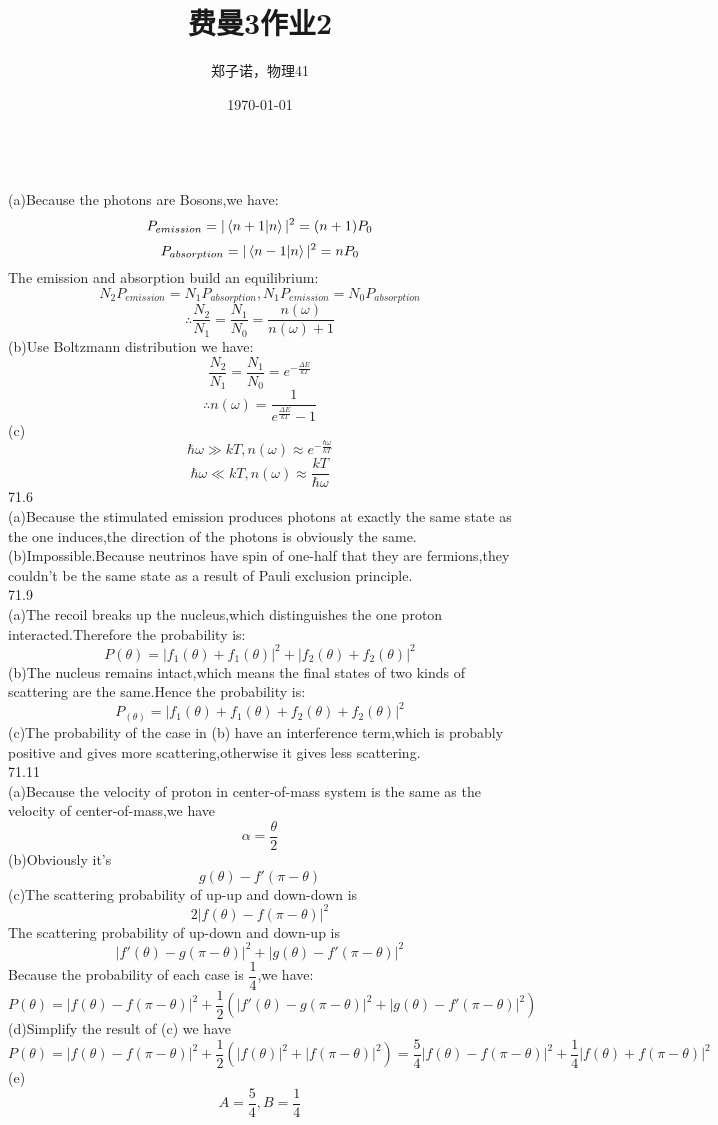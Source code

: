 \documentclass[utf8]{ctexart}
\title{费曼3作业2}
\author{郑子诺，物理41}
\date{\today}
\begin{document}
\\
(a)Because the photons are Bosons,we have:
\[P_{emission}=|\braket{n+1|n}|^2=(n+1)P_0\]
\[P_{absorption}=|\braket{n-1|n}|^2=nP_0\]
The emission and absorption build an equilibrium:
\[N_2P_{emission}=N_1P_{absorption},N_1P_{emission}=N_0P_{absorption}\]
\[\therefore\frac{N_2}{N_1}=\frac{N_1}{N_0}=\frac{n(\omega)}{n(\omega)+1}\] 
(b)Use Boltzmann distribution we have:
\[\frac{N_2}{N_1}=\frac{N_1}{N_0}=e^{-\frac{\Delta E}{kT}}\]
\[\therefore n(\omega)=\frac{1}{e^{\frac{\Delta E}{kT}}-1}\]
(c)\\
\[\hbar\omega\gg kT,n(\omega)\approx e^{-\frac{\hbar\omega}{kT}}\]
\[\hbar\omega\ll kT,n(\omega)\approx \frac{kT}{\hbar\omega}\]
71.6\\
(a)Because the stimulated emission produces photons at exactly the same state as the one induces,the direction of the photons is obviously the same.\\
(b)Impossible.Because neutrinos have spin of one-half that they are fermions,they couldn't be the same state as a result of Pauli exclusion principle.\\
71.9\\
(a)The recoil breaks up the nucleus,which distinguishes the one proton interacted.Therefore the probability is:
\[P(\theta)=|f_1(\theta)+f_1(\theta)|^2+|f_2(\theta)+f_2(\theta)|^2\]
(b)The nucleus remains intact,which means the final states of two kinds of scattering are the same.Hence the probability is:
\[P_(\theta)=|f_1(\theta)+f_1(\theta)+f_2(\theta)+f_2(\theta)|^2\]
(c)The probability of the case in (b) have an interference term,which is probably positive and gives more scattering,otherwise it gives less scattering.\\
71.11\\
(a)Because the velocity of proton in center-of-mass system is the same as the velocity of center-of-mass,we have
\[\alpha=\frac{\theta}{2}\]
(b)Obviously it's
\[g(\theta)-f'(\pi-\theta)\]
(c)The scattering probability of up-up and down-down is
\[2|f(\theta)-f(\pi-\theta)|^2\]
The scattering probability of up-down and down-up is
\[|f'(\theta)-g(\pi-\theta)|^2+|g(\theta)-f'(\pi-\theta)|^2\]
Because the probability of each case is $\dfrac{1}{4}$,we have:
\[P(\theta)=|f(\theta)-f(\pi-\theta)|^2+\frac{1}{2}(|f'(\theta)-g(\pi-\theta)|^2+|g(\theta)-f'(\pi-\theta)|^2)\]
(d)Simplify the result of (c) we have
\[P(\theta)=|f(\theta)-f(\pi-\theta)|^2+\frac{1}{2}(|f(\theta)|^2+|f(\pi-\theta)|^2)=\frac{5}{4}|f(\theta)-f(\pi-\theta)|^2+\frac{1}{4}|f(\theta)+f(\pi-\theta)|^2\]
(e)\[A=\frac{5}{4},B=\frac{1}{4}\]
\end{document}
